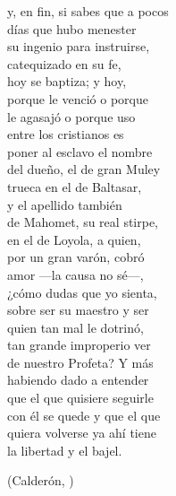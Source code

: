 \begin{exe}
	\ex \label{ex:porque}\begin{multicols}{2}
	y, en fin, si sabes que a pocos\\
	días que hubo menester\\
su ingenio para instruirse,\\
catequizado en su fe,\\
hoy se baptiza; y hoy,\\
porque le venció o porque\\
le agasajó o porque uso\\
entre los cristianos es\\
poner al esclavo el nombre\\
del dueño, el de gran Muley\\
trueca en el de Baltasar,\\
y el apellido también\\
de Mahomet, su real stirpe,\\
en el de Loyola, a quien,\\
por un gran varón, cobró\\
amor —la causa no sé—,\\
¿cómo dudas que yo sienta,\\
sobre ser su maestro y ser\\
quien tan mal le dotrinó,\\
tan grande improperio ver\\
de nuestro Profeta? Y más\\
habiendo dado a entender\\
que el que quisiere seguirle\\
con él se quede y que el que\\
quiera volverse ya ahí tiene\\
la libertad y el bajel.
\end{multicols}\strut\hfill(Calderón, )\end{exe}

